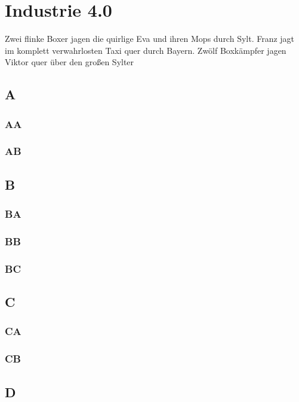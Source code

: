 \section{Industrie 4.0}
Zwei flinke Boxer jagen die quirlige Eva und ihren Mops durch Sylt. Franz jagt im komplett verwahrlosten Taxi quer durch Bayern. Zwölf Boxkämpfer jagen Viktor quer über den großen Sylter

\subsection{A}

\subsubsection{AA}

\subsubsection{AB}

\subsection{B}

\subsubsection{BA}

\subsubsection{BB}

\subsubsection{BC}

\subsection{C}

\subsubsection{CA}

\subsubsection{CB}

\subsection{D}

\newpage